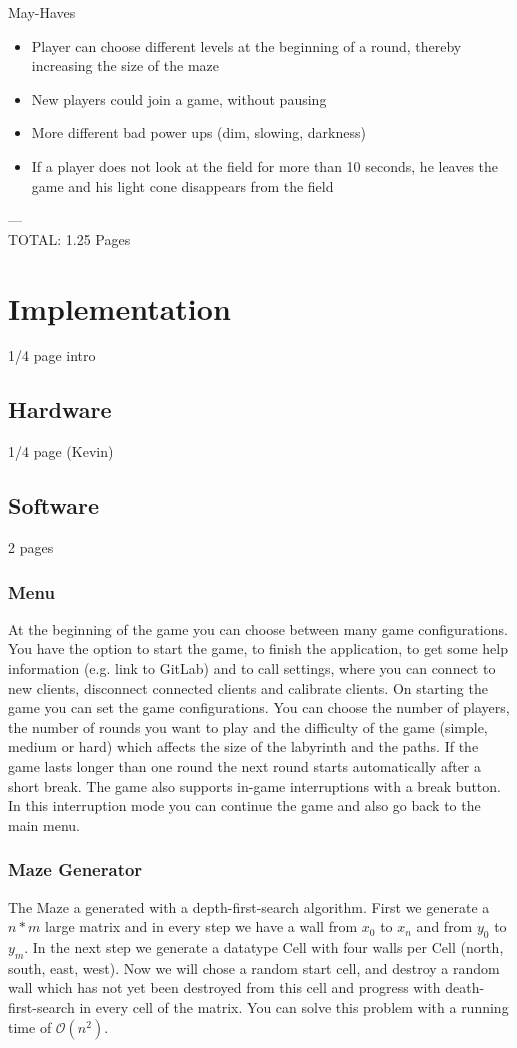 \documentclass{sigchi}
\begin{document}
	May-Haves
	\begin{itemize}
		\item Player can choose different levels at the beginning of a round, thereby increasing the size of the maze
		\item New players could join a game, without pausing 
		\item More different bad power ups (dim, slowing, darkness)
		\item If a player does not look at the field for more than 10 seconds, he leaves the game and his light cone disappears from the field
		
	\end{itemize}
---\\
TOTAL: 1.25 Pages

\section{Implementation}
1/4 page intro
\subsection{Hardware}
1/4 page (Kevin)
\subsection{Software}
2 pages
\subsubsection{Menu}
At the beginning of the game you can choose between many game configurations. You have the option to start the game, to finish the application, to get some help information (e.g. link to GitLab) and to call settings, where you can connect to new clients, disconnect connected clients and calibrate clients. On starting the game you can set the game configurations. You can choose the number of players, the number of rounds you want to play and the difficulty of the game (simple, medium or hard) which affects the size of the labyrinth and the paths. If the game lasts longer than one round the next round starts automatically after a short break. The game also supports in-game interruptions with a break button. In this interruption mode you can continue the game and also go back to the main menu.
\subsubsection{Maze Generator} 
The Maze a generated with a depth-first-search algorithm. First we generate a $n*m$ large matrix and in every step we have a wall from $x_{0}$ to $x_{n}$ and from $y_{0}$ to $y_{m}$. In the next step we generate a datatype Cell with four walls per Cell (north, south, east, west). Now we will chose a random start cell, and destroy a random wall which has not yet been destroyed from this cell and progress with death-first-search in every cell of the matrix. You can solve this problem with a running time of $\mathcal{O}(n^2)$.
\end{document}
